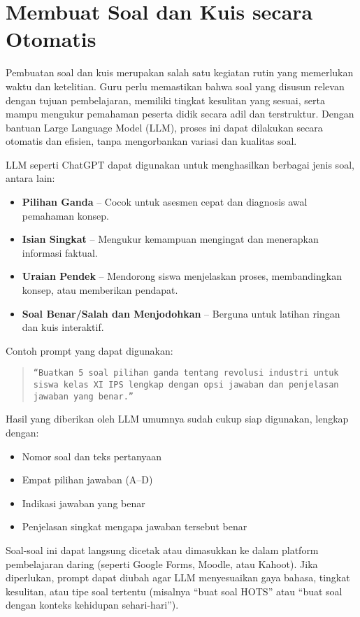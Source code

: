 \section{Membuat Soal dan Kuis secara Otomatis}

Pembuatan soal dan kuis merupakan salah satu kegiatan rutin yang memerlukan waktu dan ketelitian. Guru perlu memastikan bahwa soal yang disusun relevan dengan tujuan pembelajaran, memiliki tingkat kesulitan yang sesuai, serta mampu mengukur pemahaman peserta didik secara adil dan terstruktur. Dengan bantuan Large Language Model (LLM), proses ini dapat dilakukan secara otomatis dan efisien, tanpa mengorbankan variasi dan kualitas soal.

LLM seperti ChatGPT dapat digunakan untuk menghasilkan berbagai jenis soal, antara lain:
\begin{itemize}
	\item \textbf{Pilihan Ganda} – Cocok untuk asesmen cepat dan diagnosis awal pemahaman konsep.
	\item \textbf{Isian Singkat} – Mengukur kemampuan mengingat dan menerapkan informasi faktual.
	\item \textbf{Uraian Pendek} – Mendorong siswa menjelaskan proses, membandingkan konsep, atau memberikan pendapat.
	\item \textbf{Soal Benar/Salah dan Menjodohkan} – Berguna untuk latihan ringan dan kuis interaktif.
\end{itemize}

Contoh prompt yang dapat digunakan:
\begin{quote}
	\centering
	\texttt{“Buatkan 5 soal pilihan ganda tentang revolusi industri untuk siswa kelas XI IPS lengkap dengan opsi jawaban dan penjelasan jawaban yang benar.”}
\end{quote}

Hasil yang diberikan oleh LLM umumnya sudah cukup siap digunakan, lengkap dengan:
\begin{itemize}
	\item Nomor soal dan teks pertanyaan
	\item Empat pilihan jawaban (A–D)
	\item Indikasi jawaban yang benar
	\item Penjelasan singkat mengapa jawaban tersebut benar
\end{itemize}

Soal-soal ini dapat langsung dicetak atau dimasukkan ke dalam platform pembelajaran daring (seperti Google Forms, Moodle, atau Kahoot). Jika diperlukan, prompt dapat diubah agar LLM menyesuaikan gaya bahasa, tingkat kesulitan, atau tipe soal tertentu (misalnya “buat soal HOTS” atau “buat soal dengan konteks kehidupan sehari-hari”).

